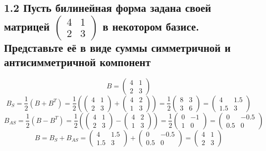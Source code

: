 \documentclass{article}
\begin{document}
\subsection*{1.2 Пусть билинейная форма задана своей матрицей \( \begin{pmatrix} 4 & 1 \\ 2 & 3 \end{pmatrix} \) в некотором базисе. Представьте её в виде суммы симметричной и антисимметричной компонент}
\[B = \begin{pmatrix} 4 & 1 \\ 2 & 3 \end{pmatrix}\]
\[B_S = \frac{1}{2}(B + B^T) = \frac{1}{2} \left( \begin{pmatrix} 4 & 1 \\ 2 & 3 \end{pmatrix} + \begin{pmatrix} 4 & 2 \\ 1 & 3 \end{pmatrix} \right) = \frac{1}{2} \begin{pmatrix} 8 & 3 \\ 3 & 6 \end{pmatrix} = \begin{pmatrix} 4 & 1.5 \\ 1.5 & 3 \end{pmatrix}\]
\[B_{AS} = \frac{1}{2}(B - B^T) = \frac{1}{2} \left( \begin{pmatrix} 4 & 1 \\ 2 & 3 \end{pmatrix} - \begin{pmatrix} 4 & 2 \\ 1 & 3 \end{pmatrix} \right) = \frac{1}{2} \begin{pmatrix} 0 & -1 \\ 1 & 0 \end{pmatrix} = \begin{pmatrix} 0 & -0.5 \\ 0.5 & 0 \end{pmatrix}\]
\[B = B_S + B_{AS} = \begin{pmatrix} 4 & 1.5 \\ 1.5 & 3 \end{pmatrix} + \begin{pmatrix} 0 & -0.5 \\ 0.5 & 0 \end{pmatrix} = \begin{pmatrix} 4 & 1 \\ 2 & 3 \end{pmatrix}\]
\end{document}
